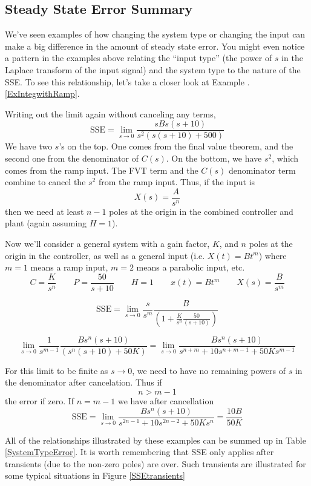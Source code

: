 \subsection{Steady State Error Summary}

We've seen examples of how changing the system type or changing the input can make a big difference in the amount of steady state error.  You might even notice a pattern in the examples above relating the ``input type'' (the power of $s$ in the Laplace transform of the input signal) and the system type to the nature of the SSE.  To see this relationship, let's take a closer look at Example \thechapter.\ref{ExIntegwithRamp}.

Writing out the limit again without canceling any terms,
\[
\mathrm{SSE} = \lim_{s\to 0} \frac{sBs(s+10)}{s^2(s(s+10)+500)}
\]
We have two $s$'s on the top.  One comes from the final value theorem, and the second one from the denominator of $C(s)$.  On the bottom, we have $s^2$, which comes from the ramp input.    The FVT term and the $C(s)$ denominator term combine to cancel the $s^2$ from the ramp input.   Thus, if the input is
\[
X(s) = \frac{A}{s^n}
\]
then we need at least $n-1$ poles at the origin in the combined controller and plant (again assuming $H=1$).


\begin{ExampleSmall}
Now we'll consider a general system with a gain factor, $K$, and $n$ poles at the origin in the controller, as well as a general input (i.e. $X(t) = Bt^m$) where $m=1$ means a ramp input, $m=2$ means a parabolic input, etc.
\[
C = \frac{K}{s^n} \qquad P = \frac{50}{s+10} \qquad H = 1 \qquad x(t) = Bt^m \qquad X(s) = \frac{B}{s^m}
\]

\[
\mathrm{SSE} = \lim_{s\to 0} \frac{s}{s^m} \frac{B}{\left(1+\frac{K}{s^n}\frac{50}{(s+10)}\right) }
\]

\[
\lim_{s\to 0} \frac{1}{s^{m-1}} \frac {Bs^n(s+10)} {(s^n(s+10)+50K)} = \lim_{s\to 0} \frac{Bs^n(s+10)} {s^{n+m}+10s^{n+m-1} + 50Ks^{m-1}}
\]


For this limit to be finite as $s\to 0$, we need to have no remaining powers of $s$ in the denominator after cancelation.  Thus  if
\[
n > m-1
\]
the error if zero.   If $n=m-1$ we have after cancellation
\[
\mathrm{SSE} = \lim_{s\to 0} \frac  {Bs^n(s+10)}   {s^{2n-1} + 10s^{2n-2} + 50Ks^n} = \frac {10B}  {50K}
\]
\end{ExampleSmall}



All of the relationships illustrated by these examples can be summed up in Table \ref{SystemTypeError}.
It is worth remembering that SSE only applies after transients (due to the non-zero poles) are over.  Such transients are illustrated for some typical situations in Figure \ref{SSEtransients}


